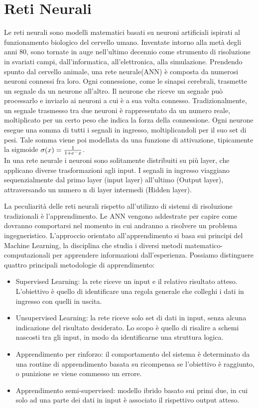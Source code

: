 \documentclass{article}
\begin{document}
\section{Reti Neurali}
Le reti neurali sono modelli matematici basati su neuroni artificiali ispirati al funzionamento biologico del cervello umano. Inventate intorno alla metà degli anni 80, sono tornate in auge nell'ultimo decennio come strumento di risoluzione in svariati campi, dall'informatica, all'elettronica, alla simulazione. 
Prendendo spunto dal cervello animale, una rete neurale(ANN) è composta da numerosi neuroni connessi fra loro. Ogni connessione, come le sinapsi cerebrali, trasmette un segnale da un neurone all'altro. Il neurone che riceve un segnale può processarlo e inviarlo ai neuroni a cui è a sua volta connesso. Tradizionalmente, un segnale trasmesso tra due neuroni è rappresentato da un numero reale, moltiplicato per un certo peso che indica la forza della connessione. Ogni neurone esegue una somma di tutti i segnali in ingresso, moltiplicandoli per il suo set di pesi. Tale somma viene poi modellata da una funzione di attivazione, tipicamente la sigmoide
$\sigma(x) = {1 \over 1+e^-x}$.\\
In una rete neurale i neuroni sono solitamente distribuiti su più layer, che applicano diverse trasformazioni agli input. I segnali in ingresso viaggiano sequenzialmente dal primo layer (input layer) all'ultimo (Output layer), attraversando un numero n di layer intermedi (Hidden layer).

La peculiarità delle reti neurali rispetto all'utilizzo di sistemi di risoluzione tradizionali è l'apprendimento. Le ANN vengono addestrate per capire come dovranno comportarsi nel momento in cui andranno a risolvere un problema ingegneristico. L'approccio orientato all'apprendimento si basa sui principi del Machine Learning, la disciplina che studia i diversi metodi matematico-computazionali per apprendere informazioni dall'esperienza. Possiamo distinguere quattro principali metodologie di apprendimento:

\begin{itemize}
\item Supervised Learning: la rete riceve un input e il relativo risultato atteso. L'obiettivo è quello di identificare una regola generale che colleghi i dati in ingresso con quelli in uscita.
\item Unsupervised Learning: la rete riceve solo set di dati in input, senza alcuna indicazione del risultato desiderato. Lo scopo è quello di risalire a schemi nascosti tra gli input, in modo da identificarne una struttura logica.
\item Apprendimento per rinforzo: il comportamento del sistema è determinato da una routine di apprendimento basata su ricompensa se l'obiettivo è raggiunto, o punizione se viene commesso un errore.
\item Apprendimento semi-supervised: modello ibrido basato sui primi due, in cui solo ad una parte dei dati in input è associato il rispettivo output atteso.
\end{itemize}
\end{document}
